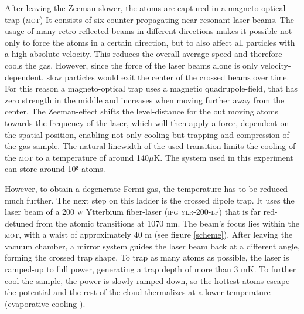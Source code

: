After leaving the Zeeman slower, the atoms are captured in a magneto-optical trap (\textsc{mot})
It consists of six counter-propagating near-resonant laser beams. The usage of many retro-reflected beams in different directions makes it possible not only to force the atoms in a certain direction, but to also affect all particles with a high absolute velocity. This reduces the overall average-speed and therefore cools the gas. However, since the force of the laser beams alone is only velocity-dependent, slow particles would exit the center of the crossed beams over time. For this reason a magneto-optical trap uses a magnetic quadrupole-field, that has zero strength in the middle and increases when moving further away from the center. The Zeeman-effect shifts the level-distance for the out moving atoms towards the frequency of the laser, which will then apply a force, dependent on the spatial position, enabling not only cooling but trapping and compression of the gas-sample. The natural linewidth of the used transition limits the cooling of the \textsc{mot} to a temperature of around 140$\mu \mathrm{K}$. The system used in this experiment can store around 10⁸ atoms. 

However, to obtain a degenerate Fermi gas, the temperature has to be reduced much further. The next step on this ladder is the crossed dipole trap. 
It uses the laser beam of a 200 \textsc{w} Ytterbium fiber-laser (\textsc{ipg ylr-200-lp}) that is far red-detuned from the atomic transitions at 1070 nm. The beam's focus lies within the \textsc{mot}, with a waist of approximately 40 \mu m \cite{lompe} (see figure \ref{scheme}). After leaving the vacuum chamber, a mirror system guides the laser beam back at a different angle, forming the crossed trap shape. To trap as many atoms as possible, the laser is ramped-up to full power, generating a trap depth of more than 3 mK. To further cool the sample, the power is slowly ramped down, so the hottest atoms escape the potential and the rest of the cloud thermalizes at a lower temperature (evaporative cooling \cite{metcalf}).

